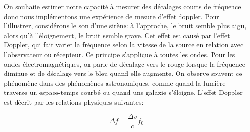 \begin{onehalfspace}
    On souhaite estimer notre capacité à mesurer des décalages courts de 
    fréquence donc nous implémentons une expérience de mesure d'effet 
    doppler. Pour l’illustrer, considérons le son d’une sirène:
    à l’approche, le bruit semble plus aigu, alors qu'à l'éloignement, 
    le bruit semble grave. Cet effet est 
    causé par l’effet Doppler, qui fait varier 
    la fréquence selon la vitesse de la source 
    en relation avec l'observateur ou récepteur. 
    Ce principe s’applique à toutes les ondes. 
    Pour les ondes électromagnétiques, on parle 
    de décalage vers le rouge lorsque la 
    fréquence diminue et de décalage vers le 
    bleu quand elle augmente. On observe souvent 
    ce phénomène dans des phénomènes 
    astronomiques, comme quand la lumière 
    traverse un espace-temps courbé ou quand une galaxie s'éloigne.  
    L'effet Doppler est décrit par les relations 
    physiques suivantes: 
\end{onehalfspace}

\begin{equation}
    \Delta f = \frac{\Delta v}{c}f_0
\end{equation}

